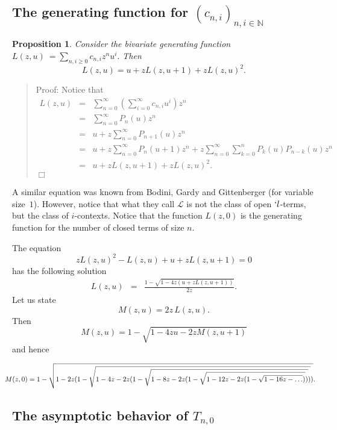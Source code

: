 \documentclass{jfp1}
\newenvironment{proof}[1]{\begin{quotation}\noindent\textsf{Proof:} #1}
{\(\Box\)\end{quotation}}
\newtheorem{prop}[theo]{Proposition}
\newcommand{\nat}{\ensuremath{\mathbb{N}}}
\begin{document}
\subsection{The generating function for $(c_{n,i})_{n,i \in \nat}$}
\label{sec:generating-function}

\begin{prop}\label{prop:genfun}
  Consider the bivariate generating function 
  \( \displaystyle L(z,u) \ = \sum_{n,i\ge 0} c_{n,i} z^n u^i.\) Then \[{L(z,u)=u + z
    L(z,u+1) + z L(z,u)^2}.\]
\end{prop}
\begin{proof}{}
  Notice that
  \begin{eqnarray*}
    L(z,u) &=& \sum_{n =0}^{\infty} \left(\sum_{i=0}^{\infty}c_{n,i}  u^i\right)z^n\\
    &=& \sum_{n =0}^{\infty} P_n(u) z^n\\
    &=& u + z \sum_{n =0}^{\infty} P_{n+1}(u)z^n\\
    &=& u + z\sum_{n =0}^{\infty} P_n(u+1) z^n+  z \sum_{n =0}^{\infty} \sum_{k=0}^n P_{k}(u)
    P_{n-k}(u) z^n\\
    &=& u + z L(z,u+1) + z L(z,u)^2.
  \end{eqnarray*}
\end{proof}
A similar equation was known from Bodini, Gardy and Gittenberger
\cite{gittenberger-2011-ltbuh} (for variable size~$1$).  However, notice
that what they call $\mathcal{L}$ is not the class of open \mbox{$`l$-terms,} but the class
of $i$-contexts.  Notice that the function $L(z,0)$ is the generating function for the
number of closed terms of size $n$. 

The equation
\begin{displaymath}
  z L(z,u)^2 - L(z,u)  + u + z L(z,u+1) = 0
\end{displaymath}
has the following solution
\begin{eqnarray*}
  L(z,u) &=& \frac{1- \sqrt{1-4z (u + z L(z,u+1))}}{2z}.
\end{eqnarray*}
 Let us state
\[M(z,u) = 2z \, L(z,u) .\]
Then
\[M(z,u) = 1- \sqrt{1-4 z u - 2z M(z,u+1)}\]
and hence
\begin{footnotesize}
  \[\hspace{-.4cm}M(z,0) = 1- \sqrt{1 - 2z(1- \sqrt{1-4z - 2z(1- \sqrt{1-8z - 2z(1-
        \sqrt{1-12z - 2z(1-
        \sqrt{1-16z - \ldots })})})})}.\]
\end{footnotesize}

\subsection{The asymptotic behavior of $T_{n,0}$}
\label{sec:two}
\end{document}
